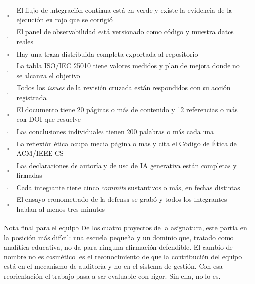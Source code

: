 \documentclass[11pt,a4paper]{article}
\begin{document}
\begin{center}
\begin{longtable}{@{}p{0.7cm}p{14.2cm}@{}}
			$\square$ & El flujo de integración continua está en verde y existe la evidencia de la ejecución en rojo que se corrigió \\
			$\square$ & El panel de observabilidad está versionado como código y muestra datos reales \\
			$\square$ & Hay una traza distribuida completa exportada al repositorio \\
			$\square$ & La tabla ISO/IEC 25010 tiene valores medidos y plan de mejora donde no se alcanza el objetivo \\
			$\square$ & Todos los \emph{issues} de la revisión cruzada están respondidos con su acción registrada \\
			$\square$ & El documento tiene 20 páginas o más de contenido y 12 referencias o más con DOI que resuelve \\
			$\square$ & Las conclusiones individuales tienen 200 palabras o más cada una \\
			$\square$ & La reflexión ética ocupa media página o más y cita el Código de Ética de ACM/IEEE-CS \\
			$\square$ & Las declaraciones de autoría y de uso de IA generativa están completas y firmadas \\
			$\square$ & Cada integrante tiene cinco \emph{commits} sustantivos o más, en fechas distintas \\
			$\square$ & El ensayo cronometrado de la defensa se grabó y todos los integrantes hablan al menos tres minutos \\
			\bottomrule
		\end{longtable}
	\end{center}
	
	\vspace{6pt}
	\begin{uteqbox}{Nota final para el equipo}
		De los cuatro proyectos de la asignatura, este partía en la posición más difícil: una escuela pequeña y un dominio que, tratado como analítica educativa, no da para ninguna afirmación defendible. El cambio de nombre no es cosmético; es el reconocimiento de que la contribución del equipo está en el mecanismo de auditoría y no en el sistema de gestión. Con esa reorientación el trabajo pasa a ser evaluable con rigor. Sin ella, no lo es.
	\end{uteqbox}
	
\end{document}
